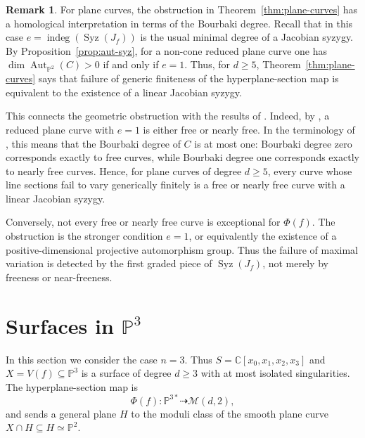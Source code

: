 \documentclass[11pt]{amsart}
\theoremstyle{plain}
\theoremstyle{definition}
\newtheorem{rk}[subsection]{Remark}
\numberwithin{equation}{section}
\newcommand{\M}{{\mathcal M}}
\newcommand{\C}{\mathbb{C}}
\newcommand{\PP}{\mathbb{P}}
\DeclareMathOperator{\Aut}{Aut}
\begin{document}
\begin{rk}
\label{rk:plane-curve-bourbaki}
For plane curves, the obstruction in Theorem~\ref{thm:plane-curves} has a
homological interpretation in terms of the Bourbaki degree. Recall that in this
case $e=\operatorname{indeg}(\operatorname{Syz}(J_f))$ is the usual minimal
degree of a Jacobian syzygy. By Proposition~\ref{prop:aut-syz}, for a non-cone
reduced plane curve one has $\dim\Aut_{\PP^2}(C)>0$ if and only if $e=1$.
Thus, for $d\geq5$, Theorem~\ref{thm:plane-curves} says that failure of generic
finiteness of the hyperplane-section map is equivalent to the existence of a linear
Jacobian syzygy.

This connects the geometric obstruction with the results of \cite{JNS}. Indeed,
by \cite[Corollary~2.11]{JNS}, a reduced plane curve with $e=1$ is either free
or nearly free. In the terminology of \cite{JNS}, this means that the Bourbaki
degree of $C$ is at most one: Bourbaki degree zero corresponds exactly to free
curves, while Bourbaki degree one corresponds exactly to nearly free curves.
Hence, for plane curves of degree $d\geq5$, every curve whose line sections fail
to vary generically finitely is a free or nearly free curve with a linear
Jacobian syzygy.

Conversely, not every free or nearly free curve is exceptional for $\Phi(f)$.
The obstruction is the stronger condition $e=1$, or equivalently the existence
of a positive-dimensional projective automorphism group. Thus the failure of
maximal variation is detected by the first graded piece of
$\operatorname{Syz}(J_f)$, not merely by freeness or near-freeness.
\end{rk}



















\section{Surfaces in \texorpdfstring{$\PP^3$}{P3}}
\label{sec:surfaces}

In this section we consider the case $n=3$. Thus
$S=\C[x_0,x_1,x_2,x_3]$ and $X=V(f)\subseteq\PP^3$ is a surface of degree
$d\geq3$ with at most isolated singularities. The hyperplane-section map is
\[
\Phi(f):\PP^{3*}\dashrightarrow \M(d,2),
\]
and sends a general plane $H$ to the moduli class of the smooth plane curve
$X\cap H\subseteq H\simeq\PP^2$.
\end{document}
